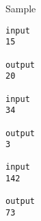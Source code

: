 Sample
\begin{verbatim}
input 
15 
 
output 
20

input 
34 
 
output 
3 

input 
142 
 
output 
73 
\end{verbatim}